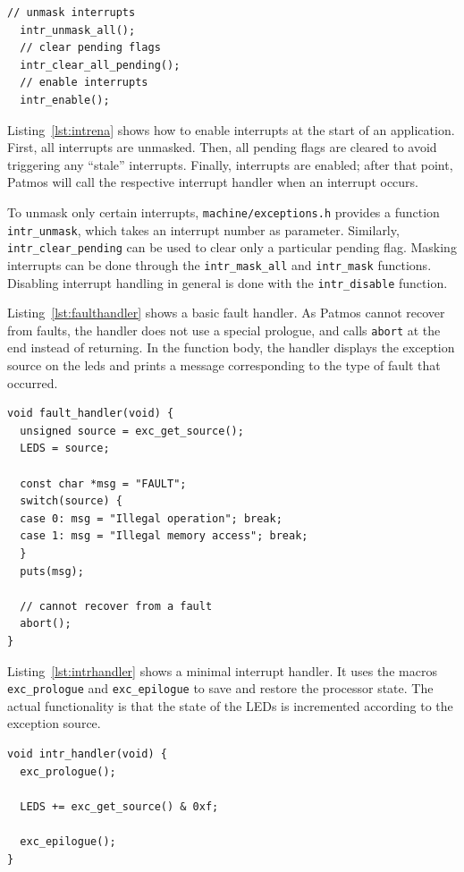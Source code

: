 \documentclass[a4paper,fontsize=10pt,twoside,DIV15,BCOR12mm,headinclude=true,footinclude=false,pagesize,bibtotoc]{scrbook}
\begin{document}
\begin{lstlisting}[float, caption={Interrupt enabling\label{lst:intrena}}]
  // unmask interrupts
  intr_unmask_all();
  // clear pending flags
  intr_clear_all_pending();
  // enable interrupts
  intr_enable();
\end{lstlisting}

Listing~\ref{lst:intrena} shows how to enable interrupts at the start
of an application. First, all interrupts are unmasked. Then, all
pending flags are cleared to avoid triggering any ``stale''
interrupts. Finally, interrupts are enabled; after that point, Patmos
will call the respective interrupt handler when an interrupt occurs.

To unmask only certain interrupts, \texttt{machine/exceptions.h}
provides a function \texttt{intr\_unmask}, which takes an interrupt
number as parameter. Similarly, \texttt{intr\_clear\_pending} can be
used to clear only a particular pending flag. Masking interrupts can
be done through the \texttt{intr\_mask\_all} and \texttt{intr\_mask}
functions. Disabling interrupt handling in general is done with the
\texttt{intr\_disable} function.

Listing~\ref{lst:faulthandler} shows a basic fault handler. As Patmos
cannot recover from faults, the handler does not use a special
prologue, and calls \texttt{abort} at the end instead of returning. In
the function body, the handler displays the exception source on the
leds and prints a message corresponding to the type of fault that
occurred.

\begin{lstlisting}[float, caption={Fault handler example\label{lst:faulthandler}}]
void fault_handler(void) {
  unsigned source = exc_get_source();
  LEDS = source;

  const char *msg = "FAULT";
  switch(source) {
  case 0: msg = "Illegal operation"; break;
  case 1: msg = "Illegal memory access"; break;
  }
  puts(msg);

  // cannot recover from a fault
  abort();
}
\end{lstlisting}

Listing~\ref{lst:intrhandler} shows a minimal interrupt handler. It
uses the macros \texttt{exc\_prologue} and \texttt{exc\_epilogue} to
save and restore the processor state. The actual functionality is that
the state of the LEDs is incremented according to the exception source.

\begin{lstlisting}[float, caption={Interrupt handler example\label{lst:intrhandler}}]
void intr_handler(void) {
  exc_prologue();

  LEDS += exc_get_source() & 0xf;

  exc_epilogue();
}
\end{lstlisting}
\end{document}
